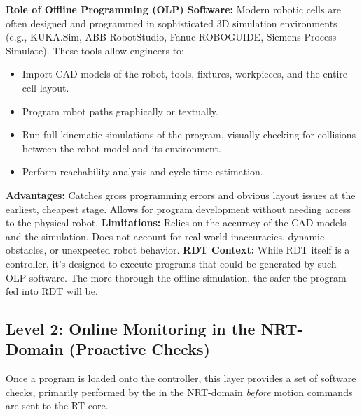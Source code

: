     \textbf{Role of Offline Programming (OLP) Software:} Modern robotic cells are often designed and programmed in sophisticated 3D simulation environments (e.g., KUKA.Sim, ABB RobotStudio, Fanuc ROBOGUIDE, Siemens Process Simulate). These tools allow engineers to:
        \begin{itemize}
            \item Import CAD models of the robot, tools, fixtures, workpieces, and the entire cell layout.
            \item Program robot paths graphically or textually.
            \item Run full kinematic simulations of the program, visually checking for collisions between the robot model and its environment.
            \item Perform reachability analysis and cycle time estimation.
        \end{itemize}
    \textbf{Advantages:} Catches gross programming errors and obvious layout issues at the earliest, cheapest stage. Allows for program development without needing access to the physical robot.
    \textbf{Limitations:} Relies on the accuracy of the CAD models and the simulation. Does not account for real-world inaccuracies, dynamic obstacles, or unexpected robot behavior.
    \textbf{RDT Context:} While RDT itself is a controller, it's designed to execute programs that could be generated by such OLP software. The more thorough the offline simulation, the safer the program fed into RDT will be.


\subsection{Level 2: Online Monitoring in the NRT-Domain (Proactive Checks)}
\label{subsec:nrt_online_monitoring}
Once a program is loaded onto the controller, this layer provides a set of software checks, primarily performed by the  in the NRT-domain \textit{before} motion commands are sent to the RT-core.


